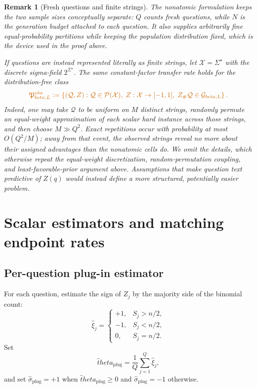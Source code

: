 \documentclass[11pt]{article}
\def\beta{beta}%
\def\theta{theta}%
\newtheorem{remark}[theorem]{Remark}
\newcommand{\calQ}{\mathcal Q}
\newcommand{\calG}{\mathcal G}
\newcommand\ced[1]{{\color{teal!70!black} #1}}
\newcommand\ded[1]{{\color{orange!80!black} #1}}
\begin{document}
\begin{remark}[Fresh questions and finite strings]
\label{rem:nonatomic}
\ded{The nonatomic formulation keeps the two sample sizes conceptually separate: $Q$ counts fresh questions, while $N$ is the generation budget attached to each question.  It also supplies arbitrarily fine equal-probability partitions while keeping the population distribution fixed, which is the device used in the proof above.}

\ded{If questions are instead represented literally as finite strings, let $\mathcal X=\Sigma^\star$ with the discrete sigma-field $2^{\Sigma^\star}$.  The same constant-factor transfer rate holds for the distribution-free class}
\[
\ded{
\mathfrak P^{\mathrm{obs}}_{\beta,L}
:=
\left\{
(\calQ,Z):
\calQ\in\mathcal P(\mathcal X),\;
Z:\mathcal X\to[-1,1],\;
Z_\#\calQ\in\calG_{\beta,L}
\right\}.
}
\]
\ded{Indeed, one may take $\calQ$ to be uniform on $M$ distinct strings, randomly permute an equal-weight approximation of each scalar hard instance across those strings, and then choose $M\gg Q^2$.  Exact repetitions occur with probability at most $O(Q^2/M)$; away from that event, the observed strings reveal no more about their assigned advantages than the nonatomic cells do.  We omit the details, which otherwise repeat the equal-weight discretization, random-permutation coupling, and least-favorable-prior argument above.  Assumptions that make question text predictive of $Z(q)$ would instead define a more structured, potentially easier problem.}
\end{remark}

\section{Scalar estimators and matching endpoint rates}
\label{sec:scalar-estimators}

\subsection{Per-question plug-in estimator}

For each question, estimate the sign of $Z_j$ by the majority side of the binomial count:
\[
\widehat\xi_j
=
\begin{cases}
+1,&S_j>n/2,\\
-1,&S_j<n/2,\\
0,&S_j=n/2.
\end{cases}
\]
Set
\[
\widehat\theta_{\mathrm{plug}}
=
\frac1Q\sum_{j=1}^Q\widehat\xi_j,
\]
\ced{and set $\widehat\sigma_{\mathrm{plug}}=+1$ when $\widehat\theta_{\mathrm{plug}}\ge0$ and $\widehat\sigma_{\mathrm{plug}}=-1$ otherwise.}
\end{document}
